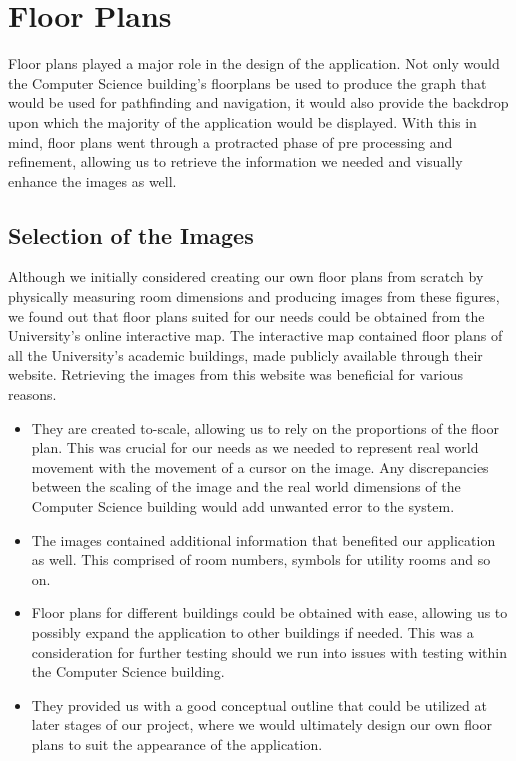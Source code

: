 \documentclass[main.tex]{subfiles}
\begin{document}
\section{Floor Plans}
    
Floor plans played a major role in the design of the application. Not only would the Computer Science building's floorplans be used to produce the graph that would be used for pathfinding and navigation, it would also provide the backdrop upon which the majority of the application would be displayed. With this in mind, floor plans went through a protracted phase of pre processing and refinement, allowing us to retrieve the information we needed and visually enhance the images as well.

\subsection{Selection of the Images}

Although we initially considered creating our own floor plans from scratch by physically measuring room dimensions and producing images from these figures, we found out that floor plans suited for our needs could be obtained from the University's online interactive map. The interactive map contained floor plans of all the University's academic buildings, made publicly available through their website. Retrieving the images from this website was beneficial for various reasons.

\begin{itemize}

\item They are created to-scale, allowing us to rely on the proportions of the floor plan. This was crucial for our needs as we needed to represent real world movement with the movement of a cursor on the image. Any discrepancies between the scaling of the image and the real world dimensions of the Computer Science building would add unwanted error to the system.

\item The images contained additional information that benefited our application as well. This comprised of room numbers, symbols for utility rooms and so on.

\item Floor plans for different buildings could be obtained with ease, allowing us to possibly expand the application to other buildings if needed. This was a consideration for further testing should we run into issues with testing within the Computer Science building.

\item They provided us with a good conceptual outline that could be utilized at later stages of our project, where we would ultimately design our own floor plans to suit the appearance of the application.
\end{itemize}
		
\end{document}
